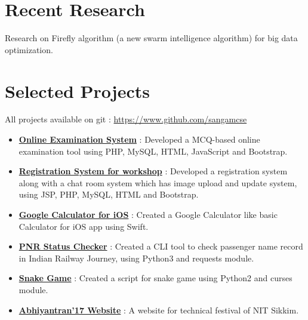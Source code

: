 \documentclass[margin, centered]{res}
\begin{document}
\begin{resume}
    \section{Recent Research}
    Research on Firefly algorithm (a new swarm intelligence algorithm) for big data optimization.

    \section{Selected Projects}
    All projects available on git : \url{https://www.github.com/sangamcse}
    \begin{itemize}[leftmargin=*]
        \item \textbf{\href{https://github.com/sangamcse/online-examination-system}{Online Examination System}} :
              Developed a MCQ-based online examination tool using PHP, MySQL, HTML, JavaScript and Bootstrap.
        \item \textbf{\href{https://github.com/sangamcse/registration-ESAD}{Registration System for workshop}} :
              Developed a registration system along with a chat room system which has image upload and update system,
              using JSP, PHP, MySQL, HTML and Bootstrap.
        \item \textbf{\href{https://github.com/sangamcse/calculator}{Google Calculator for iOS}} : Created a Google
              Calculator like basic Calculator for iOS app using Swift.
        \item \textbf{\href{https://github.com/sangamcse/myPNRStatus}{PNR Status Checker}} : Created a CLI tool
              to check passenger name record in Indian Railway Journey, using Python3 and requests module.
        \item \textbf{\href{https://github.com/sangamcse/Snake_game}{Snake Game}} : Created a script for snake game using
              Python2 and curses module.
        \item \textbf{\href{http://abhiyantran.nitsikkim.ac.in/abhiyantran-17/}{Abhiyantran'17 Website}} : A website for technical festival of NIT Sikkim.
    \end{itemize}


\end{resume}
\end{document}
